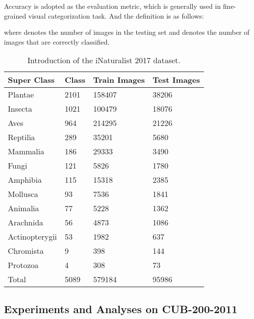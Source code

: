 \documentclass[sigconf, nonacm]{acmart}
\begin{document}
Accuracy is adopted as the evaluation metric, which is generally used in fine-grained visual categorization task. And the definition is as follows:

where  denotes the number of images in the testing set and  denotes the number of images that are correctly classified.




\begin{table}[!t]
 \centering
 \caption{Introduction of the iNaturalist 2017 dataset.}
 \label{table_inat2017}
 \begin{tabularx}{\linewidth}{|p{2cm}|Y|Y|Y|}
  \hline
  
  Super Class    & Class & Train Images & Test Images  \\ \hline
 
  Plantae    & 2101 & 158407 & 38206\\
  
  Insecta    & 1021 & 100479 & 18076\\  
  
  
  
  Aves    & 964 & 214295 & 21226\\
  
  Reptilia    & 289 & 35201 & 5680\\ 
  
  
  Mammalia    & 186 & 29333 & 3490\\ 


  Fungi   & 121 & 5826 & 1780\\ 
  Amphibia    & 115 & 15318 & 2385\\ 
  Mollusca    & 93 & 7536 & 1841\\
  Animalia    & 77 & 5228 & 1362 \\
  Arachnida    & 56 & 4873 & 1086 \\
  Actinopterygii    & 53 & 1982 & 637\\
  Chromista    & 9 & 398 & 144\\
  Protozoa    &  4 & 308 & 73 \\ \hline
  Total    & 5089 & 579184 & 95986 \\
  
  \hline
  
 \end{tabularx}
\end{table}



\subsection{Experiments and Analyses on CUB-200-2011}
\label{ Experiments on the CUB-200-2011}
\end{document}
